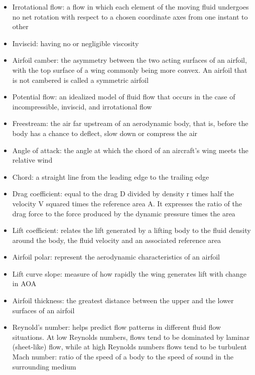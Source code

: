 \documentclass{journal}
\begin{document}
	\begin{itemize}
		\item Irrotational flow: a flow in which each element of the moving fluid undergoes no net rotation with respect to a chosen coordinate axes from one instant to other
		\item Inviscid: having no or negligible viscosity
		\item Airfoil camber: the asymmetry between the two acting surfaces of an airfoil, with the top surface of a wing commonly being more convex. An airfoil that is not cambered is called a symmetric airfoil
		\item Potential flow: an idealized model of fluid flow that occurs in the case of incompressible, inviscid, and irrotational flow
		\item Freestream: the air far upstream of an aerodynamic body, that is, before the body has a chance to deflect, slow down or compress the air
		\item Angle of attack: the angle at which the chord of an aircraft's wing meets the relative wind
		\item Chord: a straight line from the leading edge to the trailing edge
		\item Drag coefficient: equal to the drag D divided by density r times half the velocity V squared times the reference area A. It expresses the ratio of the drag force to the force produced by the dynamic pressure times the area
		\item Lift coefficient: relates the lift generated by a lifting body to the fluid density around the body, the fluid velocity and an associated reference area
		\item Airfoil polar: represent the aerodynamic characteristics of an airfoil
		\item Lift curve slope: measure of how rapidly the wing generates lift with change in AOA
		\item Airfoil thickness: the greatest distance between the upper and the lower surfaces of an airfoil
		\item Reynold's number: helps predict flow patterns in different fluid flow situations. At low Reynolds numbers, flows tend to be dominated by laminar (sheet-like) flow, while at high Reynolds numbers flows tend to be turbulent
		Mach number: ratio of the speed of a body to the speed of sound in the surrounding medium
	\end{itemize}
	
	
\end{document}
